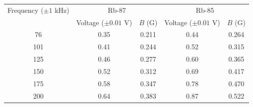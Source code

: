 \begin{tabular}{ccccc}
  \hline
  Frequency ($\pm 1$ kHz) & \multicolumn{2}{c}{Rb-87} & \multicolumn{2}{c}{Rb-85} \\
   & Voltage ($\pm 0.01$ V) & $B$ (G) & Voltage ($\pm 0.01$ V) & $B$ (G) \\
  \hline
    76 & 0.35 & 0.211 & 0.44 & 0.264 \\
    101 & 0.41 & 0.244 & 0.52 & 0.315 \\
    125 & 0.46 & 0.277 & 0.60 & 0.365 \\
    150 & 0.52 & 0.312 & 0.69 & 0.417 \\
    175 & 0.58 & 0.347 & 0.78 & 0.470 \\
    200 & 0.64 & 0.383 & 0.87 & 0.522 \\
  \hline
\end{tabular}